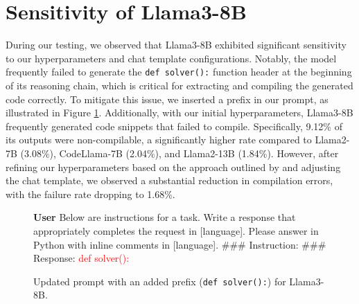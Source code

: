 
\section{Sensitivity of Llama3-8B}
During our testing, we observed that Llama3-8B exhibited significant sensitivity to our hyperparameters and chat template configurations.
%
Notably, the model frequently failed to generate the \texttt{def solver():} function header at the beginning of its reasoning chain, which is critical for extracting and compiling the generated code correctly.
%
To mitigate this issue, we inserted a prefix in our prompt, as illustrated in Figure \ref{fig:llama3-prompt}.
%
Additionally, with our initial hyperparameters, Llama3-8B frequently generated code snippets that failed to compile. Specifically, 9.12\% of its outputs were non-compilable, a significantly higher rate compared to Llama2-7B (3.08\%), CodeLlama-7B (2.04\%), and Llama2-13B (1.84\%). 
%
However, after refining our hyperparameters based on the approach outlined by \cite{tulu3} and adjusting the chat template, we observed a substantial reduction in compilation errors, with the failure rate dropping to 1.68\%.
%

\begin{figure}[H]
    \small
    \centering
    \begin{mdframed}
    \textbf{User} \newline
    Below are instructions for a task. \newline
    Write a response that appropriately completes the request in [language]. Please answer in Python with inline comments in [language].\newline
    \#\#\# Instruction: \newline[Question]\newline
    \#\#\# Response:\newline
    \textcolor{red}{def solver():} 
    \end{mdframed}
    \caption{
    Updated prompt with an added prefix (\texttt{def solver():}) for Llama3-8B.
    }
    \label{fig:llama3-prompt}
\end{figure}



